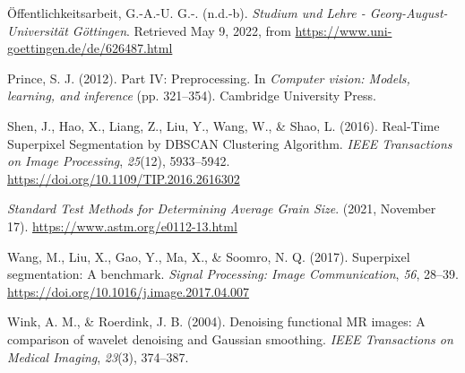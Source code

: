 \documentclass[
  12pt,
]{book}
\newlength{\cslhangindent}
\newlength{\cslentryspacingunit} %
\newenvironment{CSLReferences}[2] %
 {%
  \setlength{\parindent}{0pt}
  \ifodd #1
  \let\oldpar\par
  \def\par{\hangindent=\cslhangindent\oldpar}
  \fi
  \setlength{\parskip}{#2\cslentryspacingunit}
 }%
 {}
\begin{document}
\begin{CSLReferences}{1}{0}
\leavevmode{}%
Öffentlichkeitsarbeit, G.-A.-U. G.-. (n.d.-b). \emph{Studium und Lehre - Georg-August-Universität Göttingen}. Retrieved May 9, 2022, from \url{https://www.uni-goettingen.de/de/626487.html}

\leavevmode{}%
Prince, S. J. (2012). Part {IV}: {Preprocessing}. In \emph{Computer vision: Models, learning, and inference} (pp. 321--354). {Cambridge University Press}.

\leavevmode{}%
Shen, J., Hao, X., Liang, Z., Liu, Y., Wang, W., \& Shao, L. (2016). Real-{Time Superpixel Segmentation} by {DBSCAN Clustering Algorithm}. \emph{IEEE Transactions on Image Processing}, \emph{25}(12), 5933--5942. \url{https://doi.org/10.1109/TIP.2016.2616302}

\leavevmode{}%
\emph{Standard {Test Methods} for {Determining Average Grain Size}}. (2021, November 17). \url{https://www.astm.org/e0112-13.html}

\leavevmode{}%
Wang, M., Liu, X., Gao, Y., Ma, X., \& Soomro, N. Q. (2017). Superpixel segmentation: {A} benchmark. \emph{Signal Processing: Image Communication}, \emph{56}, 28--39. \url{https://doi.org/10.1016/j.image.2017.04.007}

\leavevmode{}%
Wink, A. M., \& Roerdink, J. B. (2004). Denoising functional {MR} images: A comparison of wavelet denoising and {Gaussian} smoothing. \emph{IEEE Transactions on Medical Imaging}, \emph{23}(3), 374--387.

\end{CSLReferences}
\end{document}
